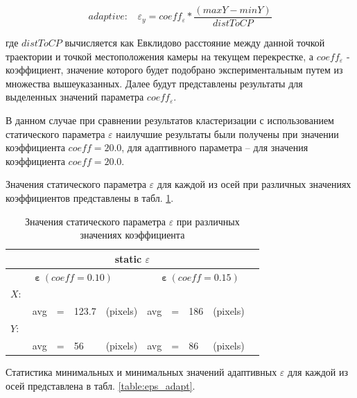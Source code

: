\begin{equation} \label{eq:epsY-adapt}
	adaptive:\ \ \ \ \varepsilon_y = coeff_\varepsilon * \frac{(maxY - minY)}{distToCP}
\end{equation}

где $distToCP$ вычисляется как Евклидово расстояние между данной точкой траектории и точкой местоположения камеры на текущем перекрестке, а $coeff_\varepsilon$ - коэффициент, значение которого будет подобрано экспериментальным путем из множества вышеуказанных. Далее будут представлены результаты для выделенных значений параметра $coeff_\varepsilon$. 

В данном случае при сравнении результатов кластеризации с использованием статического параметра $\varepsilon$ наилучшие результаты были получены при значении коэффициента $coeff = 20.0$, для адаптивного параметра -- для значения коэффициента $coeff = 20.0$.

Значения статического параметра $\varepsilon$ для каждой из осей при различных значениях коэффициентов представлены в табл. \ref{table:eps_st}.

\begin{table}[htb!]
	\caption{Значения статического параметра $\varepsilon$ при различных значениях коэффициента}
	\label{table:eps_st}
	
	\setlength{\tabcolsep}{10pt}
	\centering

	\begin{tabular}
		{||lllll|lllll||}
		\multicolumn{10}{c}{static $\varepsilon$} \\[0.5ex]
		\hline
		\multicolumn{5}{||c}{$\bm{\varepsilon}\ (coeff = 0.10)$} & \multicolumn{5}{c||}{$\bm{\varepsilon}\ (coeff = 0.15)$} \\[0.5ex]
		$X:$       			& & & & & & & & & \\[0.5ex]
		& avg 	& = 	& 123.7 	& (pixels) & avg 	& = 	& 186 	& (pixels) &\\[0.5ex]
		$Y:$       			& & & & & & & & & \\[0.5ex]
		& avg 	& = 	& 56	 	& (pixels) & avg 	& = 	& 86 	& (pixels) &\\[0.5ex]
		\hline
	\end{tabular}
\end{table}

Статистика минимальных и минимальных значений адаптивных $\varepsilon$ для каждой из осей представлена в табл. \ref{table:eps_adapt}.

